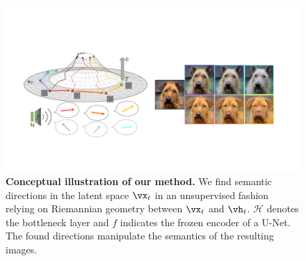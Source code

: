
\begin{figure}[!t]
    \centering
    \includegraphics[width=0.9\linewidth]{./figure/teaser.pdf}
    \caption{\textbf{Conceptual illustration of our method.} 
    We find semantic directions in the latent space $\vx_t$ in an unsupervised fashion relying on Riemannian geometry between $\vx_t$ and $\vh_t$. $\mathcal{H}$ denotes the bottleneck layer and $f$ indicates the frozen encoder of a U-Net. 
    The found directions manipulate the semantics of the resulting images.
    }
    \vspace{-1em}
    \label{fig:main_concept}
\end{figure}


